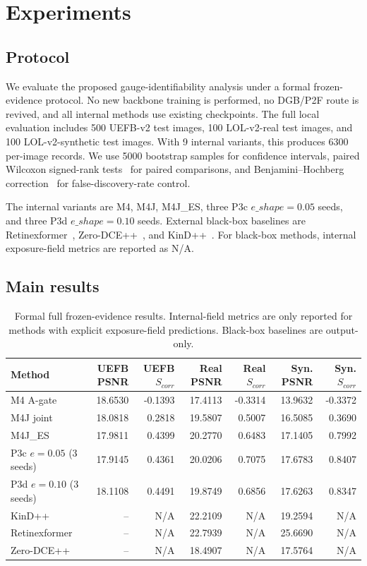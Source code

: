 \section{Experiments}
\label{sec:experiments}

\subsection{Protocol}

We evaluate the proposed gauge-identifiability analysis under a formal frozen-evidence protocol. No new backbone training is performed, no DGB/P2F route is revived, and all internal methods use existing checkpoints. The full local evaluation includes 500 UEFB-v2 test images, 100 LOL-v2-real test images, and 100 LOL-v2-synthetic test images. With 9 internal variants, this produces 6300 per-image records. We use 5000 bootstrap samples for confidence intervals, paired Wilcoxon signed-rank tests~\cite{wilcoxon1945ranking} for paired comparisons, and Benjamini--Hochberg correction~\cite{benjamini1995fdr} for false-discovery-rate control.

The internal variants are M4, M4J, M4J\_ES, three P3c $e\_shape=0.05$ seeds, and three P3d $e\_shape=0.10$ seeds. External black-box baselines are Retinexformer~\cite{cai2023retinexformer}, Zero-DCE++~\cite{li2021zerodcepp}, and KinD++~\cite{zhang2019kind}. For black-box methods, internal exposure-field metrics are reported as N/A.

\subsection{Main results}

\begin{table}[t]
\centering
\small
\begin{tabular}{lrrrrrr}
\hline
Method & UEFB PSNR & UEFB $S_{corr}$ & Real PSNR & Real $S_{corr}$ & Syn. PSNR & Syn. $S_{corr}$ \\
\hline
M4 A-gate & 18.6530 & -0.1393 & 17.4113 & -0.3314 & 13.9632 & -0.3372 \\
M4J joint & 18.0818 & 0.2818 & 19.5807 & 0.5007 & 16.5085 & 0.3690 \\
M4J\_ES & 17.9811 & 0.4399 & 20.2770 & 0.6483 & 17.1405 & 0.7992 \\
P3c $e=0.05$ (3 seeds) & 17.9145 & 0.4361 & 20.0206 & 0.7075 & 17.6783 & 0.8407 \\
P3d $e=0.10$ (3 seeds) & 18.1108 & 0.4491 & 19.8749 & 0.6856 & 17.6263 & 0.8347 \\
KinD++ & -- & N/A & 22.2109 & N/A & 19.2594 & N/A \\
Retinexformer & -- & N/A & 22.7939 & N/A & 25.6690 & N/A \\
Zero-DCE++ & -- & N/A & 18.4907 & N/A & 17.5764 & N/A \\
\hline
\end{tabular}
\caption{Formal full frozen-evidence results. Internal-field metrics are only reported for methods with explicit exposure-field predictions. Black-box baselines are output-only.}
\label{tab:main_results}
\end{table}


